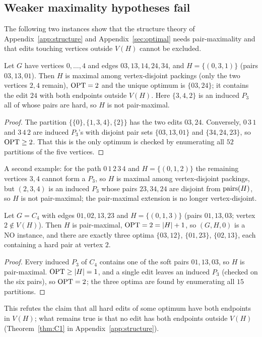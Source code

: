 \subsection{Weaker maximality hypotheses fail}
The following two instances show that the structure theory of Appendix~\ref{app:structure} and Appendix~\ref{sec:optimal} needs pair-maximality and that edits touching vertices outside $V(H)$ cannot be excluded.
\begin{proposition}\label{prop:vertexmax}
Let $G$ have vertices $0,\dots,4$ and edges $03,13,14,24,34$, and $H=\{(0,3,1)\}$ (pairs $03,13,01$). Then $H$ is maximal among vertex-disjoint packings (only the two vertices $2,4$ remain), $\mathrm{OPT}=2$ and the unique optimum is $\{03,24\}$; it contains the edit $24$ with both endpoints outside $V(H)$. Here $\{3,4,2\}$ is an induced $P_3$ all of whose pairs are hard, so $H$ is not pair-maximal.
\end{proposition}
\begin{proof}
The partition $\{\{0\},\{1,3,4\},\{2\}\}$ has the two edits $03,24$. Conversely, $0\,3\,1$ and $3\,4\,2$ are induced $P_3$'s with disjoint pair sets $\{03,13,01\}$ and $\{34,24,23\}$, so $\mathrm{OPT}\ge2$. That this is the only optimum is checked by enumerating all $52$ partitions of the five vertices.
\end{proof}
A second example: for the path $0\,1\,2\,3\,4$ and $H=\{(0,1,2)\}$ the remaining vertices $3,4$ cannot form a $P_3$, so $H$ is maximal among vertex-disjoint packings, but $(2,3,4)$ is an induced $P_3$ whose pairs $23,34,24$ are disjoint from $\mathrm{pairs}(H)$, so $H$ is not pair-maximal; the pair-maximal extension is no longer vertex-disjoint.
\begin{proposition}\label{prop:c4}
Let $G=C_4$ with edges $01,02,13,23$ and $H=\{(0,1,3)\}$ (pairs $01,13,03$; vertex $2\notin V(H)$). Then $H$ is pair-maximal, $\mathrm{OPT}=2=|H|+1$, so $(G,H,0)$ is a NO instance, and there are exactly three optima $\{03,12\}$, $\{01,23\}$, $\{02,13\}$, each containing a hard pair at vertex $2$.
\end{proposition}
\begin{proof}
Every induced $P_3$ of $C_4$ contains one of the soft pairs $01,13,03$, so $H$ is pair-maximal. $\mathrm{OPT}\ge|H|=1$, and a single edit leaves an induced $P_3$ (checked on the six pairs), so $\mathrm{OPT}=2$; the three optima are found by enumerating all $15$ partitions.
\end{proof}
This refutes the claim that all hard edits of some optimum have both endpoints in $V(H)$; what remains true is that no edit has both endpoints outside $V(H)$ (Theorem~\ref{thm:C1} in Appendix~\ref{app:structure}).
